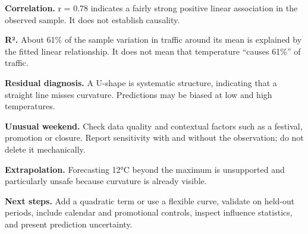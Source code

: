 \documentclass[11pt,a4paper]{article}
\begin{document}
\textbf{Correlation.} r = 0.78 indicates a fairly strong positive linear association in the observed sample. It does not establish causality.

\textbf{R².} About 61\% of the sample variation in traffic around its mean is explained by the fitted linear relationship. It does not mean that temperature ``causes 61\%'' of traffic.

\textbf{Residual diagnosis.} A U-shape is systematic structure, indicating that a straight line misses curvature. Predictions may be biased at low and high temperatures.

\textbf{Unusual weekend.} Check data quality and contextual factors such as a festival, promotion or closure. Report sensitivity with and without the observation; do not delete it mechanically.

\textbf{Extrapolation.} Forecasting 12°C beyond the maximum is unsupported and particularly unsafe because curvature is already visible.

\textbf{Next steps.} Add a quadratic term or use a flexible curve, validate on held-out periods, include calendar and promotional controls, inspect influence statistics, and present prediction uncertainty.
\end{document}
